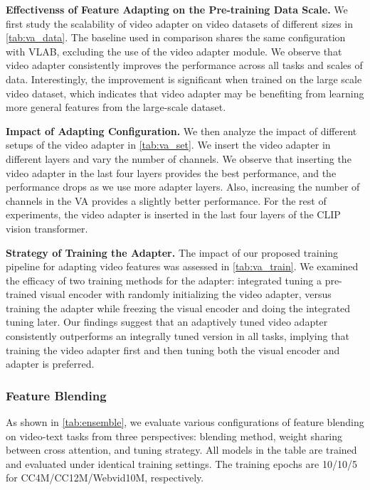 \documentclass{article}
\begin{document}
\noindent\textbf{Effectivenss of Feature Adapting on the Pre-training Data Scale.}
We first study the scalability of video adapter on  video datasets of different sizes in \cref{tab:va_data}.  The baseline used in comparison shares the same configuration with VLAB, excluding the use of the video adapter module. We observe that video adapter consistently improves the performance across all tasks and scales of data. Interestingly, the improvement is significant when trained on the large scale video dataset, which indicates that video adapter may be benefiting from learning more general features from the large-scale dataset. 

\noindent\textbf{Impact of Adapting Configuration.}
We then analyze the impact of different setups of the video adapter in \cref{tab:va_set}. We insert the video adapter in different layers and vary the number of channels. We observe that inserting the video adapter in the last four layers provides the best performance, and the performance drops as we use more adapter layers. Also, increasing the number of channels in the VA provides a slightly better performance. For the rest of experiments, the video adapter is inserted in the last four layers of the CLIP vision transformer.

\noindent\textbf{Strategy of Training the Adapter.}
The impact of our proposed training pipeline for adapting video features was assessed in \cref{tab:va_train}. We examined the efficacy of two training methods for the adapter: integrated tuning a pre-trained visual encoder with randomly initializing the video adapter, versus training the adapter while freezing the visual encoder and doing the integrated tuning later. Our findings suggest that an adaptively tuned video adapter consistently outperforms an integrally tuned version in all tasks, implying that training the video adapter first and then tuning both the visual encoder and adapter is preferred.


\subsubsection{Feature Blending}
\label{sec:feature_blending}
As shown in \cref{tab:ensemble}, we evaluate various configurations of feature blending on video-text tasks from three perspectives: blending method, weight sharing between cross attention, and tuning strategy. All models in the table are trained and evaluated under identical training settings. The training epochs are 10/10/5 for CC4M/CC12M/Webvid10M, respectively.
\end{document}
